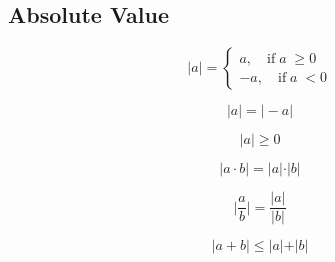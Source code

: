 \documentclass[12pt, a5paper]{article}
\begin{document}
\subsection*{Absolute Value}

$$
\vert a \vert = \left\{ \begin{aligned} a,\quad\text{if}\;a\; \ge 0 \\ -a,\quad\text{if}\;a\; < 0 \end{aligned} \right.
$$

$$
\vert a \vert = \vert -a \vert 
$$

$$
\vert a \vert \ge 0 
$$

$$
\vert a \cdot b \vert = \vert a \vert \cdot \vert b \vert
$$

$$
\Big\vert \dfrac{a}{b} \Big\vert = \dfrac{\vert a \vert}{\vert b \vert} 
$$

$$
\vert a + b \vert \le \vert a \vert + \vert b \vert 
$$
\end{document}
